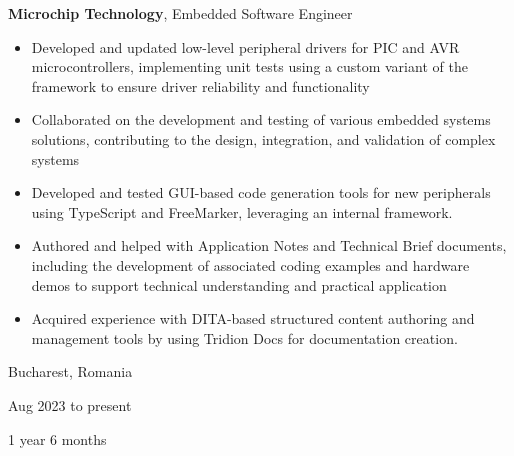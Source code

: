 \documentclass[10pt, letterpaper]{article}
\newenvironment{highlights}{
    \begin{itemize}[
        topsep=0.10 cm,
        parsep=0.10 cm,
        partopsep=0pt,
        itemsep=0pt,
        leftmargin=0.4 cm + 10pt
    ]
}{
    \end{itemize}
} %
\newenvironment{twocolentry}[2][]{
    \onecolentry
    \def\secondColumn{#2}
    \setcolumnwidth{\fill, 3.5 cm}
    \begin{paracol}{2}
}{
    \switchcolumn \raggedleft \secondColumn
    \end{paracol}
    \endonecolentry
} %
\let\hrefWithoutArrow\href
\renewcommand{\href}[2]{\hrefWithoutArrow{#1}{\ifthenelse{\equal{#2}{}}{ }{#2 }\raisebox{.15ex}{\footnotesize \faExternalLink*}}}
\begin{document}
        
        \begin{twocolentry}{
            Bucharest, Romania

        Aug 2023 to present

        1 year 6 months
        }
            \textbf{Microchip Technology}, Embedded Software Engineer
            \begin{highlights}
                \item Developed and updated low-level peripheral drivers for PIC and AVR microcontrollers, implementing unit tests using a custom variant of the \href{https://www.throwtheswitch.org/unity}{Unity} framework to ensure driver reliability and functionality
                \item Collaborated on the development and testing of various embedded systems solutions, contributing to the design, integration, and validation of complex systems
                \item Developed and tested GUI-based code generation tools for new peripherals using TypeScript and FreeMarker, leveraging an internal framework.
                \item Authored and helped with Application Notes and Technical Brief documents, including the development of associated coding examples and hardware demos to support technical understanding and practical application
                \item Acquired experience with DITA-based structured content authoring and management tools by using Tridion Docs for documentation creation.
            \end{highlights}
        \end{twocolentry}


        \vspace{0.2 cm}
\end{document}
